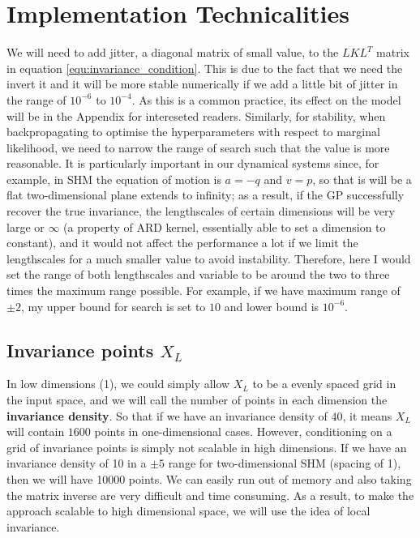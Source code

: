 \documentclass{statsmsc}
\begin{document}
\section{Implementation Technicalities}
We will need to add jitter, a diagonal matrix of small value, to the $LKL^T$ matrix in equation \ref{equ:invariance_condition}.
This is due to the fact that we need the invert it and it will be more stable numerically if we add a little bit of jitter in the range of $10^{-6}$ to $10^{-4}$.
As this is a common practice, its effect on the model will be in the Appendix for intereseted readers.
Similarly, for stability, when backpropagating to optimise the hyperparameters with respect to marginal likelihood, we need to narrow the range of search such that the value is more reasonable.
It is particularly important in our dynamical systems since, for example, in SHM the equation of motion is $a=-q$ and $v=p$, so that is will be a flat two-dimensional plane extends to infinity;
as a result, if the GP successfully recover the true invariance, the lengthscales of certain dimensions will be very large or $\infty$ (a property of ARD kernel, essentially able to set a dimension to constant), and it would not affect the performance a lot if we limit the lengthscales for a much smaller value to avoid instability.
Therefore, here I would set the range of both lengthscales and variable to be around the two to three times the maximum range possible.
For example, if we have maximum range of $\pm 2$, my upper bound for search is set to $10$ and lower bound is $10^{-6}$.

\subsection*{Invariance points $X_L$}
In low dimensions (1), we could simply allow $X_L$ to be a evenly spaced grid in the input space, and we will call the number of points in each dimension the \textbf{invariance density}.
So that if we have an invariance density of $40$, it means $X_L$ will contain $1600$ points in one-dimensional cases. 
However, conditioning on a grid of invariance points is simply not scalable in high dimensions. 
If we have an invariance density of 10 in a $\pm 5$ range for two-dimensional SHM (spacing of 1), then we will have 10000 points. 
We can easily run out of memory and also taking the matrix inverse are very difficult and time consuming.
As a result, to make the approach scalable to high dimensional space, we will use the idea of local invariance. 
\end{document}
